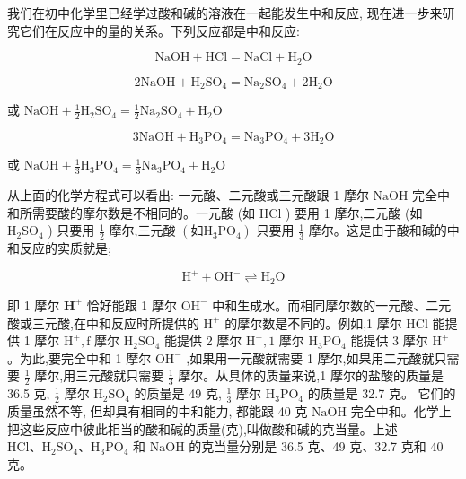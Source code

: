 \documentclass[10pt]{article}
\begin{document}
我们在初中化学里已经学过酸和碱的溶液在一起能发生中和反应, 现在进一步来研究它们在反应中的量的关系。下列反应都是中和反应:

\[
\mathrm{{NaOH}} + \mathrm{{HCl}} = \mathrm{{NaCl}} + {\mathrm{H}}_{2}\mathrm{O}
\]

\[
2\mathrm{{NaOH}} + {\mathrm{H}}_{2}{\mathrm{{SO}}}_{4} = {\mathrm{{Na}}}_{2}{\mathrm{{SO}}}_{4} + 2{\mathrm{H}}_{2}\mathrm{O}
\]

或 \(\mathrm{{NaOH}} + \frac{1}{2}{\mathrm{H}}_{2}{\mathrm{{SO}}}_{4} = \frac{1}{2}{\mathrm{{Na}}}_{2}{\mathrm{{SO}}}_{4} + {\mathrm{H}}_{2}\mathrm{O}\)

\[
3\mathrm{{NaOH}} + {\mathrm{H}}_{3}{\mathrm{{PO}}}_{4} = {\mathrm{{Na}}}_{3}{\mathrm{{PO}}}_{4} + 3{\mathrm{H}}_{2}\mathrm{O}
\]

或 \(\mathrm{{NaOH}} + \frac{1}{3}{\mathrm{H}}_{3}{\mathrm{{PO}}}_{4} = \frac{1}{3}{\mathrm{{Na}}}_{3}{\mathrm{{PO}}}_{4} + {\mathrm{H}}_{2}\mathrm{O}\)

从上面的化学方程式可以看出: 一元酸、二元酸或三元酸跟 1 摩尔 \(\mathrm{{NaOH}}\) 完全中和所需要酸的摩尔数是不相同的。一元酸 (如 \(\mathrm{{HCl}}\) ) 要用 1 摩尔,二元酸 (如 \({\mathrm{H}}_{2}{\mathrm{{SO}}}_{4}\) ) 只要用 \(\frac{1}{2}\) 摩尔,三元酸 \(\left( {\text{如}{\mathrm{H}}_{3}{\mathrm{{PO}}}_{4}}\right)\) 只要用 \(\frac{1}{3}\) 摩尔。这是由于酸和碱的中和反应的实质就是;

\[
{\mathrm{H}}^{ + } + {\mathrm{{OH}}}^{ - } \rightleftharpoons {\mathrm{H}}_{2}\mathrm{O}
\]

即 1 摩尔 \({\mathbf{H}}^{ + }\) 恰好能跟 1 摩尔 \({\mathrm{{OH}}}^{ - }\) 中和生成水。而相同摩尔数的一元酸、二元酸或三元酸,在中和反应时所提供的 \({\mathrm{H}}^{ + }\) 的摩尔数是不同的。例如,1 摩尔 \(\mathrm{{HCl}}\) 能提供 1 摩尔 \({\mathrm{H}}^{ + },\mathrm{f}\) 摩尔 \({\mathrm{H}}_{2}{\mathrm{{SO}}}_{4}\) 能提供 2 摩尔 \({\mathrm{H}}^{ + },1\) 摩尔 \({\mathrm{H}}_{3}{\mathrm{{PO}}}_{4}\) 能提供 3 摩尔 \({\mathrm{H}}^{ + }\) 。为此,要完全中和 1 摩尔 \({\mathrm{{OH}}}^{ - }\) ,如果用一元酸就需要 1 摩尔,如果用二元酸就只需要 \(\frac{1}{2}\) 摩尔,用三元酸就只需要 \(\frac{1}{3}\) 摩尔。从具体的质量来说,1 摩尔的盐酸的质量是 36.5 克, \(\frac{1}{2}\) 摩尔 \({\mathrm{H}}_{2}{\mathrm{{SO}}}_{4}\) 的质量是 49 克, \(\frac{1}{3}\) 摩尔 \({\mathrm{H}}_{3}{\mathrm{{PO}}}_{4}\) 的质量是 32.7 克。 它们的质量虽然不等, 但却具有相同的中和能力, 都能跟 40 克 \(\mathrm{{NaOH}}\) 完全中和。化学上把这些反应中彼此相当的酸和碱的质量(克),叫做酸和碱的克当量。上述 \(\mathrm{{HCl}}\text{、}{\mathrm{H}}_{2}{\mathrm{{SO}}}_{4}\text{、}{\mathrm{H}}_{3}{\mathrm{{PO}}}_{4}\) 和 \(\mathrm{{NaOH}}\) 的克当量分别是 36.5 克、49 克、32.7 克和 40 克。
\end{document}
